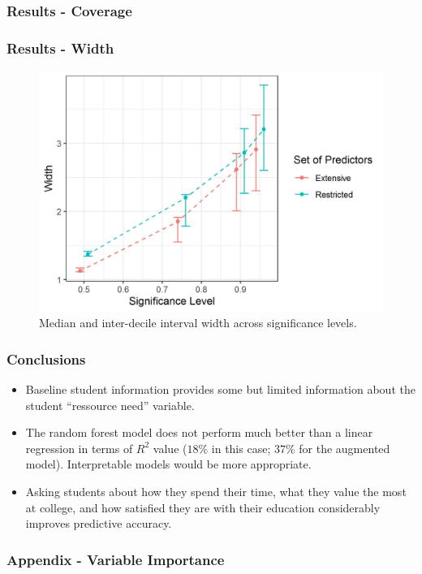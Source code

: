 \documentclass{beamer}
\begin{document}
\begin{frame} \frametitle{Results - Coverage}  

\end{frame}

\begin{frame} \frametitle{Results - Width}   
\begin{figure}
	\centering
	\includegraphics[scale = 0.5]{conformal.jpeg}
	\caption{Median and inter-decile interval width across significance levels.}
	\label{fig:conformal}
\end{figure}
\end{frame}

\begin{frame} \frametitle{Conclusions}

\begin{itemize}
	\item Baseline student information provides some but limited information about the student ``ressource need'' variable.
	\item The random forest model does not perform much better than a linear regression in terms of $R^2$ value ($18\%$ in this case; $37\%$ for the augmented model). Interpretable models would be more appropriate.
	\item Asking students about how they spend their time, what they value the most at college, and how satisfied they are with their education considerably improves predictive accuracy.
\end{itemize}


\end{frame}

\begin{frame} \frametitle{Appendix - Variable Importance}    

\end{frame}
\end{document}
